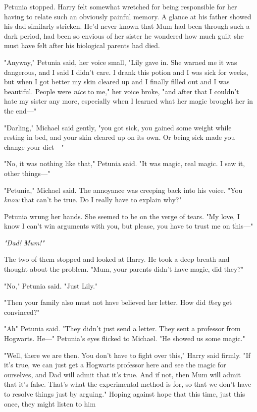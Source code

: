 Petunia stopped. Harry felt somewhat wretched for being
responsible for her having to relate such an obviously
painful memory. A glance at his father showed his dad
similarly stricken. He'd never known that Mum had been
through such a dark period, had been so envious of her
sister{\el} he wondered how much guilt she must have felt
after his biological parents had died.

"Anyway," Petunia said, her voice small, "Lily gave in. She
warned me it was dangerous, and I said I didn't care. I
drank this potion and I was sick for weeks, but when I
got better my skin cleared up and I finally filled out and{\el}
I was beautiful. People were \emph{nice} to me," her voice broke,
"and after that I couldn't hate my sister any more,
especially when I learned what her magic brought her in
the end—"

"Darling," Michael said gently, "you got sick, you gained
some weight while resting in bed, and your skin cleared up
on its own. Or being sick made you change your diet—"

"No, it was nothing like that," Petunia said. "It was magic,
real magic. I saw it, other things—"

"Petunia," Michael said. The annoyance was creeping back
into his voice. "You \emph{know} that can't be true. Do I really
have to explain why?"

Petunia wrung her hands. She seemed to be on the verge
of tears. "My love, I know I can't win arguments with you,
but please, you have to trust me on this—"

\emph{"Dad! Mum!"}

The two of them stopped and looked at Harry. He took a
deep breath and thought about the problem. "Mum, your
parents didn't have magic, did they?"

"No," Petunia said. "Just Lily."

"Then your family also must not have believed her letter.
How did \emph{they} get convinced?"

"Ah{\el}" Petunia said. "They didn't just send a letter. They
sent a professor from Hogwarts. He—" Petunia's eyes
flicked to Michael. "He showed us some magic."

"Well, there we are then. You don't have to fight over
this," Harry said firmly. "If it's true, we can just get a
Hogwarts professor here and see the magic for ourselves,
and Dad will admit that it's true. And if not, then Mum will
admit that it's false. That's what the experimental method
is for, so that we don't have to resolve things just by
arguing." Hoping against hope that this time, just this once,
they might listen to him{\el}

